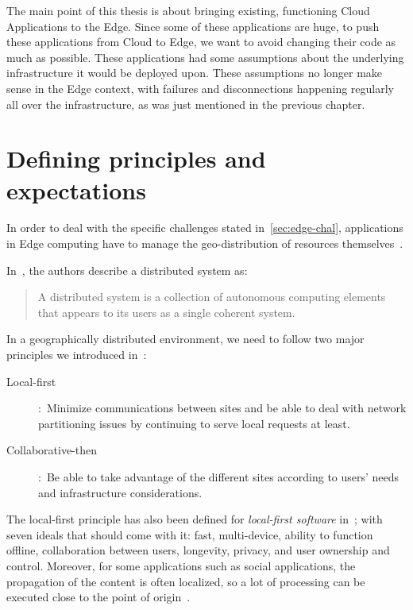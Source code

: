 The main point of this thesis is about bringing existing, functioning
Cloud Applications to the Edge.
%
Since some of these applications are huge, to push these applications
from Cloud to Edge, we want to avoid changing their code as much as
possible.
%
%
These applications had some assumptions about the underlying
infrastructure it would be deployed upon.
%
These assumptions no longer make sense in the Edge context, with
failures and disconnections happening regularly all over the
infrastructure, as was just mentioned in the previous chapter.




\section{Defining principles and expectations}
\label{sec:principles}


In order to deal with the specific challenges stated
in~\autoref{sec:edge-chal}, applications in Edge computing have to
manage the geo-distribution of resources themselves~\cite{TBRT19}.


In~\cite{ST17}, the authors describe a distributed system as:
\begin{quote}
  A distributed system is a collection of autonomous computing
  elements that appears to its users as a single coherent system.
\end{quote}

In a geographically distributed environment, we need to follow two
major principles we introduced in~\cite{CDL21}:

\begin{description}
\item [Local-first]:~Minimize communications between sites and be able
to deal with network partitioning issues by continuing to serve local
requests at least.
 \item [Collaborative-then]:~Be able to take advantage of the
 different sites according to users' needs and infrastructure
 considerations.
\end{description}

The local-first principle has also been defined for \emph{local-first
software} in~\cite{local-first}; with seven ideals that should come
with it: fast, multi-device, ability to function offline,
collaboration between users, longevity, privacy, and user ownership
and control.
%
Moreover, for some applications such as social applications, the
propagation of the content is often localized, so a lot of processing
can be executed close to the point of origin~\cite{WLSY12}.

